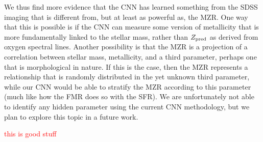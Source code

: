 \documentclass[fleqn,usenatbib]{mnras}
\newcommand{\editorial}[1]{\textcolor{red}{#1}}
\begin{document}
We thus find more evidence that the CNN has learned something from the SDSS \sdssi\sdssr\sdssg imaging that is different from, but at least as powerful as, the MZR. One way that this is possible is if the CNN can measure some version of metallicity that is more fundamentally linked to the stellar mass, rather than $Z_{\rm pred}$ as derived from oxygen spectral lines. Another possibility is that the MZR is a projection of a correlation between stellar mass, metallicity, and a third parameter, perhaps one that is morphological in nature. If this is the case, then the \cite{Tremonti2004} MZR represents a relationship that is randomly distributed in the yet unknown third parameter, while our CNN would be able to stratify the MZR according to this parameter (much like how the FMR does so with the SFR). We are unfortunately not able to identify any hidden parameter using the current CNN methodology, but we plan to explore this topic in a future work.

\editorial{this is good stuff}



%
\end{document}
